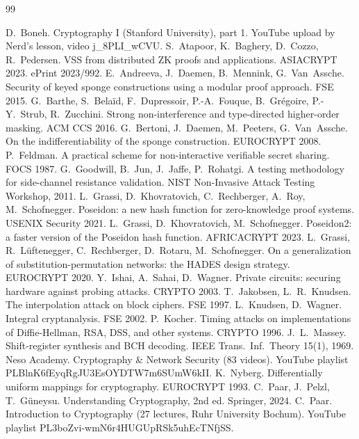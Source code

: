 \documentclass[10pt,a4paper]{article}
\theoremstyle{definition}
\theoremstyle{remark}
\begin{document}
\begin{thebibliography}{99}\small\raggedright
{} D.~Boneh. Cryptography I (Stanford University), part 1. YouTube upload by Nerd's lesson, video j\_8PLI\_wCVU.
 S.~Atapoor, K.~Baghery, D.~Cozzo, R.~Pedersen. VSS from distributed ZK proofs and applications. ASIACRYPT 2023. ePrint 2023/992.
 E.~Andreeva, J.~Daemen, B.~Mennink, G.~Van~Assche. Security of keyed sponge constructions using a modular proof approach. FSE 2015.
 G.~Barthe, S.~Bela\"id, F.~Dupressoir, P.-A.~Fouque, B.~Gr\'egoire, P.-Y.~Strub, R.~Zucchini. Strong non-interference and type-directed higher-order masking. ACM CCS 2016.
 G.~Bertoni, J.~Daemen, M.~Peeters, G.~Van~Assche. On the indifferentiability of the sponge construction. EUROCRYPT 2008.
 P.~Feldman. A practical scheme for non-interactive verifiable secret sharing. FOCS 1987.
 G.~Goodwill, B.~Jun, J.~Jaffe, P.~Rohatgi. A testing methodology for side-channel resistance validation. NIST Non-Invasive Attack Testing Workshop, 2011.
 L.~Grassi, D.~Khovratovich, C.~Rechberger, A.~Roy, M.~Schofnegger. Poseidon: a new hash function for zero-knowledge proof systems. USENIX Security 2021.
 L.~Grassi, D.~Khovratovich, M.~Schofnegger. Poseidon2: a faster version of the Poseidon hash function. AFRICACRYPT 2023.
 L.~Grassi, R.~L\"uftenegger, C.~Rechberger, D.~Rotaru, M.~Schofnegger. On a generalization of substitution-permutation networks: the HADES design strategy. EUROCRYPT 2020.
 Y.~Ishai, A.~Sahai, D.~Wagner. Private circuits: securing hardware against probing attacks. CRYPTO 2003.
 T.~Jakobsen, L.~R.~Knudsen. The interpolation attack on block ciphers. FSE 1997.
 L.~Knudsen, D.~Wagner. Integral cryptanalysis. FSE 2002.
 P.~Kocher. Timing attacks on implementations of Diffie-Hellman, RSA, DSS, and other systems. CRYPTO 1996.
 J.~L.~Massey. Shift-register synthesis and BCH decoding. IEEE Trans.\ Inf.\ Theory 15(1), 1969.
 Neso Academy. Cryptography \& Network Security (83 videos). YouTube playlist PLBlnK6fEyqRgJU3EsOYDTW7m6SUmW6kII.
 K.~Nyberg. Differentially uniform mappings for cryptography. EUROCRYPT 1993.
 C.~Paar, J.~Pelzl, T.~G\"uneysu. Understanding Cryptography, 2nd ed. Springer, 2024.
 C.~Paar. Introduction to Cryptography (27 lectures, Ruhr University Bochum). YouTube playlist PL3boZvi-wmN6r4HUGUpRSk5uhEcTNfjSS.

\end{thebibliography}
\end{document}

